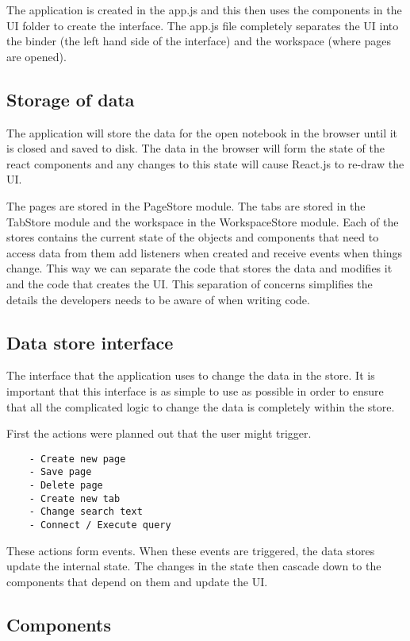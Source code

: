 The application is created in the app.js and this then uses the
components in the UI folder to create the interface. The app.js file
completely separates the UI into the binder (the left hand side of the
interface) and the workspace (where pages are opened).

\subsection{Storage of data}\label{storage-of-data}

The application will store the data for the open notebook in the browser
until it is closed and saved to disk. The data in the browser will form
the state of the react components and any changes to this state will
cause React.js to re-draw the UI.

The pages are stored in the PageStore module. The tabs are stored in the
TabStore module and the workspace in the WorkspaceStore module. Each of
the stores contains the current state of the objects and components that
need to access data from them add listeners when created and receive
events when things change. This way we can separate the code that stores
the data and modifies it and the code that creates the UI. This
separation of concerns simplifies the details the developers needs to be
aware of when writing code.

\subsection{Data store interface}\label{data-store-interface}

The interface that the application uses to change the data in the store.
It is important that this interface is as simple to use as possible in
order to ensure that all the complicated logic to change the data is
completely within the store.

First the actions were planned out that the user might trigger.

\begin{verbatim}
    - Create new page 
    - Save page 
    - Delete page 
    - Create new tab 
    - Change search text
    - Connect / Execute query
\end{verbatim}

These actions form events. When these events are triggered, the data stores
update the internal state. The changes in the state then cascade down to the
components that depend on them and update the UI.

\subsection{Components}\label{components}

